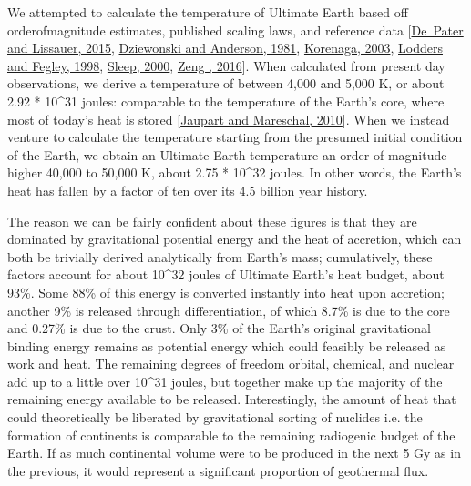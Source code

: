 \documentclass[letterpaper,10pt,english]{jupyterBook}
\begin{document}
\sphinxAtStartPar
We attempted to calculate the temperature of Ultimate Earth based off order\sphinxhyphen{}of\sphinxhyphen{}magnitude estimates, published scaling laws, and reference data {[}\hyperlink{cite.references:id503}{De Pater and Lissauer, 2015}, \hyperlink{cite.references:id647}{Dziewonski and Anderson, 1981}, \hyperlink{cite.references:id306}{Korenaga, 2003}, \hyperlink{cite.references:id292}{Lodders and Fegley, 1998}, \hyperlink{cite.references:id255}{Sleep, 2000}, \hyperlink{cite.references:id648}{Zeng , 2016}{]}. When calculated from present day observations, we derive a temperature of between 4,000 and 5,000 K, or about  2.92 * 10\textasciicircum{}31 joules: comparable to the temperature of the Earth’s core, where most of today’s heat is stored {[}\hyperlink{cite.references:id649}{Jaupart and Mareschal, 2010}{]}. When we instead venture to calculate the temperature starting from the presumed initial condition of the Earth, we obtain an Ultimate Earth temperature an order of magnitude higher \sphinxhyphen{} 40,000 to 50,000 K, about 2.75 * 10\textasciicircum{}32 joules. In other words, the Earth’s heat has fallen by a factor of ten over its 4.5 billion year history.

\sphinxAtStartPar
The reason we can be fairly confident about these figures is that they are dominated by gravitational potential energy and the heat of accretion, which can both be trivially derived analytically from Earth’s mass; cumulatively, these factors account for about 10\textasciicircum{}32 joules of Ultimate Earth’s heat budget, about 93\%. Some 88\% of this energy is converted instantly into heat upon accretion; another 9\% is released through differentiation, of which 8.7\% is due to the core and 0.27\% is due to the crust. Only 3\% of the Earth’s original gravitational binding energy remains as potential energy which could feasibly be released as work and heat. The remaining degrees of freedom \sphinxhyphen{} orbital, chemical, and nuclear \sphinxhyphen{} add up to a little over 10\textasciicircum{}31 joules, but together make up the majority of the remaining energy available to be released. Interestingly, the amount of heat that could theoretically be liberated by gravitational sorting of nuclides \sphinxhyphen{} i.e. the formation of continents \sphinxhyphen{} is comparable to the remaining radiogenic budget of the Earth. If as much continental volume were to be produced in the next 5 Gy as in the previous, it would represent a significant proportion of geothermal flux.
\end{document}
